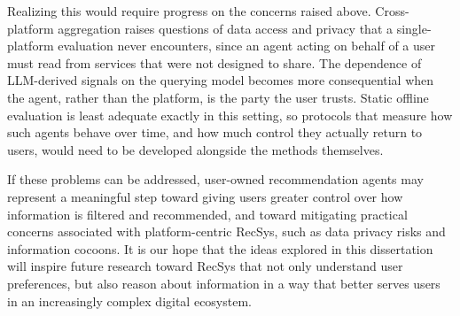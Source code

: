 Realizing this would require progress on the concerns raised above. Cross-platform aggregation raises questions of data access and privacy that a single-platform evaluation never encounters, since an agent acting on behalf of a user must read from services that were not designed to share. The dependence of LLM-derived signals on the querying model becomes more consequential when the agent, rather than the platform, is the party the user trusts. Static offline evaluation is least adequate exactly in this setting, so protocols that measure how such agents behave over time, and how much control they actually return to users, would need to be developed alongside the methods themselves.

If these problems can be addressed, user-owned recommendation agents may represent a meaningful step toward giving users greater control over how information is filtered and recommended, and toward mitigating practical concerns associated with platform-centric RecSys, such as data privacy risks and information cocoons. It is our hope that the ideas explored in this dissertation will inspire future research toward RecSys that not only understand user preferences, but also reason about information in a way that better serves users in an increasingly complex digital ecosystem.
